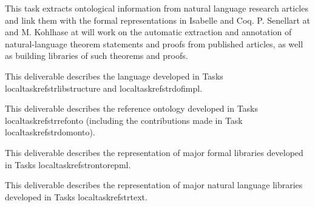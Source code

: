 \begin{workpackage}
\begin{tasklist}
\begin{task}[id=strtext,title=Ontological Representation of Natural Language Articles,lead=Inr,FauRM=6,InrRM=14]
This task extracts ontological information from natural language research articles and link them with the formal representations in Isabelle and Coq.
P. Senellart at  and M. Kohlhase at  will work on the automatic extraction and annotation of natural-language theorem statements and proofs from published articles, as well as building libraries of such theorems and proofs.
\end{task} 

%

\end{tasklist}


\begin{wpdelivs}
  \begin{wpdeliv}[due=18,miles=???,id=deliv-str-framework,dissem=PU,nature=DEM,lead=Sac]
  	{This deliverable describes the language developed in Tasks localtaskref{strlibstructure} and localtaskref{strdofimpl}.}
  \end{wpdeliv}
  \begin{wpdeliv}[due=36,miles=???,id=deliv-str-ontology,dissem=PU,nature=DEM,lead=Sac]
  	{This deliverable describes the reference ontology developed in Tasks localtaskref{strrefonto} (including the contributions made in Task localtaskref{strdomonto}).}
  \end{wpdeliv}
  \begin{wpdeliv}[due=48,miles=???,id=deliv-str-libraries,dissem=PU,nature=DEM,lead=Fau]
  	{This deliverable describes the representation of major formal libraries developed in Tasks localtaskref{strontorepml}.}
  \end{wpdeliv}
  \begin{wpdeliv}[due=48,miles=???,id=deliv-str-natlang,dissem=PU,nature=DEM,lead=Fau]
  	{This deliverable describes the representation of major natural language libraries developed in Tasks localtaskref{strtext}.}
  \end{wpdeliv}
\end{wpdelivs}




\end{workpackage}
